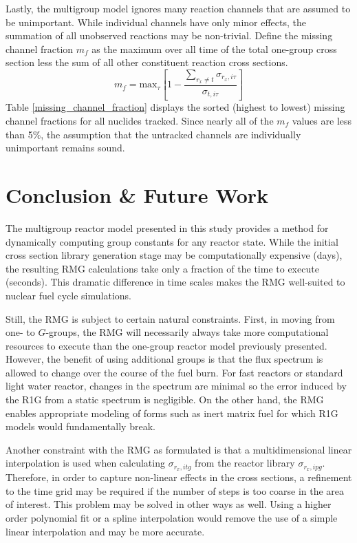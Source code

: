 Lastly, the multigroup model ignores many reaction channels that are assumed to be 
unimportant.  While individual channels have only minor effects, the summation of all 
unobserved reactions may be non-trivial.  Define the missing channel fraction $m_f$ as the maximum 
over all time of the total one-group cross section less the sum of all other constituent reaction 
cross sections.
\begin{equation}
\label{mcf}
m_f = \mbox{max}_{\tau}\left[1 - \frac{\sum_{r_x \ne t}\sigma_{r_x,i\tau}}{\sigma_{t,i\tau}}\right]
\end{equation}
Table \ref{missing_channel_fraction} displays the sorted (highest to lowest) missing 
channel fractions for all nuclides tracked.  Since nearly all of the $m_f$ values are
less than 5\%, the assumption that the untracked channels are individually unimportant
remains sound.




\section{Conclusion \& Future Work}
\label{mg_sec:conc}
The multigroup reactor model presented in this study provides a method for dynamically
computing group constants for any reactor state.  While the initial cross section library
generation stage may be computationally expensive (days), the resulting RMG calculations take
only a fraction of the time to execute (seconds).  This dramatic difference in time scales
makes the RMG well-suited to nuclear fuel cycle simulations.

Still, the RMG is subject to certain natural constraints.  First, in moving from one- to $G$-groups,
the RMG will necessarily always take more computational resources to execute than the one-group
reactor model previously presented.  However, the benefit of using additional groups is that the flux
spectrum is allowed to change over the course of the fuel burn.  For fast reactors or standard light 
water reactor, changes in the spectrum are minimal so the error induced by the R1G from a static spectrum
is negligible.  On the other hand, the RMG enables appropriate modeling of forms such as inert matrix 
fuel for which R1G models would fundamentally break.

Another constraint with the RMG as formulated is that a multidimensional linear interpolation is 
used when calculating $\sigma_{r_x,itg}$ from the reactor library $\sigma_{r_x,ipg}$.  Therefore, 
in order to capture non-linear effects in the cross sections, a refinement to the time grid may 
be required if the number of steps is too coarse in the area of interest.  This problem may be solved
in other ways as well.  Using a higher order polynomial fit or a spline interpolation would 
remove the use of a simple linear interpolation and may be more accurate.

